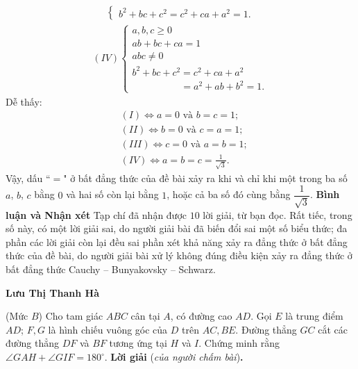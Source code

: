 \begin{multicols}{2}
\begin{align*}
\begin{cases}
			{b^2} + bc + {c^2} = {c^2} + ca + {a^2} = 1.
		\end{cases}
	\end{align*}
	\begin{align*}
		(IV)\begin{cases}
				a,b,c \ge 0\\[-0.5ex]
				ab + bc + ca = 1\\[-0.5ex]
				abc \ne 0\\[-0.5ex]
				{b^2} + bc + {c^2} = {c^2} + ca + {a^2} \\[-0.5ex]
				\quad\quad\quad\quad\quad= {a^2} + ab + {b^2} = 1.
		\end{cases}
	\end{align*}
	Dễ thấy:
	\begin{align*}
		&(I) \Leftrightarrow a = 0 \text{ và } b = c = 1;\\[-0.5ex]
		&(II) \Leftrightarrow b = 0 \text{ và } c = a = 1;\\[-0.5ex]
		&(III) \Leftrightarrow c = 0 \text{ và } a = b = 1;\\[-0.5ex]
		&(IV) \Leftrightarrow a=b=c= \frac{1}{\sqrt{3}}.
	\end{align*}
	Vậy, dấu ``$=$" ở bất đẳng thức của đề bài xảy ra khi và chỉ khi một trong ba số $a$, $b$, $c$ bằng $0$ và hai số còn lại bằng $1$, hoặc cả ba số đó cùng bằng  $\dfrac{1}{\sqrt{3}}$.
	\vskip 0.05cm
	\textbf{\color{thachthuctoanhoc}Bình luận và Nhận xét}
	\vskip 0.05cm
	Tạp chí đã nhận được $10$ lời giải, từ bạn đọc. Rất tiếc, trong số này, có một lời giải sai, do người giải bài đã biến đổi sai một số biểu thức; đa phần các lời giải còn lại đều sai phần xét khả năng xảy ra đẳng thức ở bất đẳng thức của đề bài, do người giải bài xử lý không đúng điều kiện xảy ra đẳng thức ở bất đẳng thức Cauchy -- Bunyakovsky -- Schwarz.
	\begin{flushright}
		\textbf{\color{thachthuctoanhoc}Lưu Thị Thanh Hà}
	\end{flushright}
	{}
	(Mức $B$) Cho tam giác $ABC$ cân tại $A$, có đường cao $AD$. Gọi $E$ là trung điểm $AD$; $F,G$ là hình chiếu vuông góc của $D$ trên $AC,BE$. Đường thẳng $GC$ cắt các đường thẳng $DF$ và $BF$ tương ứng tại $H$ và $I$. Chứng minh rằng $\angle{GAH}+\angle{GIF}=180^\circ$.  
	\vskip 0.05cm
	\textbf{\color{thachthuctoanhoc}Lời giải} (\textit{của người chấm bài})\textbf{\color{thachthuctoanhoc}.}
	\begin{figure}[H]
		\vspace*{-10pt}
		\centering
		\captionsetup{labelformat= empty, justification=centering}

\end{figure}
\end{multicols}

